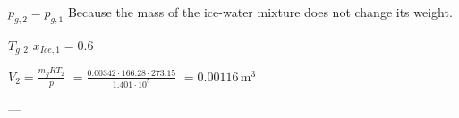 \( p_{g,2} = p_{g,1} \)  
Because the mass of the ice-water mixture does not change its weight.  

\( T_{g,2} \)  
\( x_{Ice,1} = 0.6 \)  

\( V_2 = \frac{m_g RT_2}{p} \)  
\( = \frac{0.00342 \cdot 166.28 \cdot 273.15}{1.401 \cdot 10^5} \)  
\( = 0.00116 \, \text{m}^3 \)  

---
